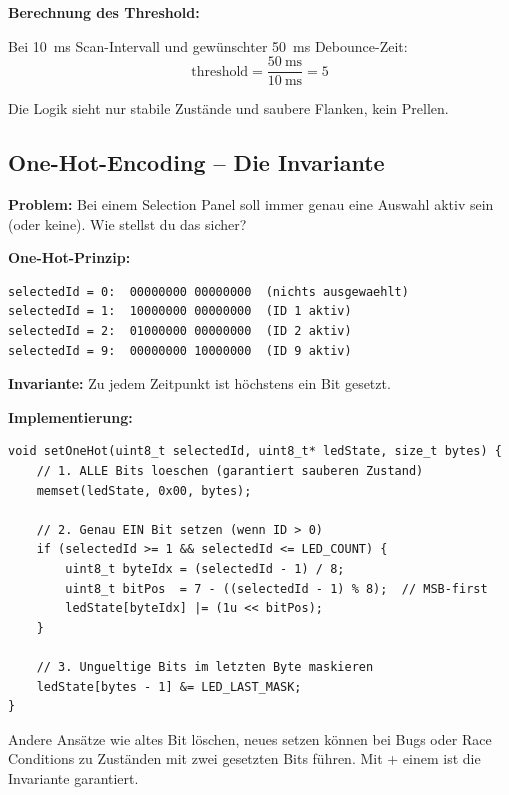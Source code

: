 \textbf{Berechnung des Threshold:}

Bei \SI{10}{\milli\second} Scan-Intervall und gewünschter \SI{50}{\milli\second} Debounce-Zeit:
\[
\text{threshold} = \frac{\SI{50}{\milli\second}}{\SI{10}{\milli\second}} = 5
\]

\begin{tipbox}[Konsequenz]
Die Logik sieht nur stabile Zustände und saubere Flanken, kein Prellen.
\end{tipbox}

\subsection{One-Hot-Encoding – Die Invariante}

\textbf{Problem:} Bei einem Selection Panel soll immer genau eine Auswahl aktiv sein (oder keine). Wie stellst du das sicher?

\textbf{One-Hot-Prinzip:}

\begin{lstlisting}[style=wrap,numbers=none]
selectedId = 0:  00000000 00000000  (nichts ausgewaehlt)
selectedId = 1:  10000000 00000000  (ID 1 aktiv)
selectedId = 2:  01000000 00000000  (ID 2 aktiv)
selectedId = 9:  00000000 10000000  (ID 9 aktiv)
\end{lstlisting}

\textbf{Invariante:} Zu jedem Zeitpunkt ist höchstens ein Bit gesetzt.

\textbf{Implementierung:}

\begin{lstlisting}[style=arduino]
void setOneHot(uint8_t selectedId, uint8_t* ledState, size_t bytes) {
    // 1. ALLE Bits loeschen (garantiert sauberen Zustand)
    memset(ledState, 0x00, bytes);

    // 2. Genau EIN Bit setzen (wenn ID > 0)
    if (selectedId >= 1 && selectedId <= LED_COUNT) {
        uint8_t byteIdx = (selectedId - 1) / 8;
        uint8_t bitPos  = 7 - ((selectedId - 1) % 8);  // MSB-first
        ledState[byteIdx] |= (1u << bitPos);
    }

    // 3. Ungueltige Bits im letzten Byte maskieren
    ledState[bytes - 1] &= LED_LAST_MASK;
}
\end{lstlisting}

\begin{infobox}
Andere Ansätze wie \glqq altes Bit löschen, neues setzen\grqq{} können bei Bugs oder Race Conditions zu Zuständen mit zwei gesetzten Bits führen. Mit  + einem \code{|=} ist die Invariante garantiert.
\end{infobox}

